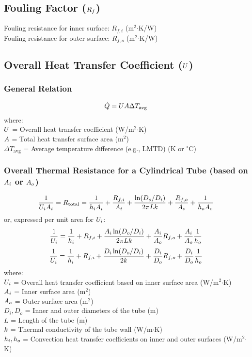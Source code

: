 \subsection{Fouling Factor ($R_f$)}
Fouling resistance for inner surface: $R_{f,i}$ (m$^2$$\cdot$K/W) \\
Fouling resistance for outer surface: $R_{f,o}$ (m$^2$$\cdot$K/W)

\subsection{Overall Heat Transfer Coefficient ($U$)}
\subsubsection*{General Relation}
\begin{equation}
    \dot{Q} = U A \Delta T_{\text{avg}}
\end{equation}
where: \\
$U$ = Overall heat transfer coefficient (W/m$^2$$\cdot$K) \\
$A$ = Total heat transfer surface area (m$^2$) \\
$\Delta T_{\text{avg}}$ = Average temperature difference (e.g., LMTD) (K or $^\circ$C)

\subsubsection*{Overall Thermal Resistance for a Cylindrical Tube (based on $A_i$ or $A_o$)}
\begin{equation}
    \frac{1}{U_i A_i} = R_{\text{total}} = \frac{1}{h_i A_i} + \frac{R_{f,i}}{A_i} + \frac{\ln(D_o/D_i)}{2\pi L k} + \frac{R_{f,o}}{A_o} + \frac{1}{h_o A_o}
\end{equation}
or, expressed per unit area for $U_i$:
\begin{equation}
    \frac{1}{U_i} = \frac{1}{h_i} + R_{f,i} + \frac{A_i \ln(D_o/D_i)}{2\pi L k} + \frac{A_i}{A_o} R_{f,o} + \frac{A_i}{A_o} \frac{1}{h_o}
\end{equation}
\begin{equation}
    \frac{1}{U_i} = \frac{1}{h_i} + R_{f,i} + \frac{D_i \ln(D_o/D_i)}{2k} + \frac{D_i}{D_o} R_{f,o} + \frac{D_i}{D_o} \frac{1}{h_o}
\end{equation}
where: \\
$U_i$ = Overall heat transfer coefficient based on inner surface area (W/m$^2$$\cdot$K) \\
$A_i$ = Inner surface area (m$^2$) \\
$A_o$ = Outer surface area (m$^2$) \\
$D_i, D_o$ = Inner and outer diameters of the tube (m) \\
$L$ = Length of the tube (m) \\
$k$ = Thermal conductivity of the tube wall (W/m$\cdot$K) \\
$h_i, h_o$ = Convection heat transfer coefficients on inner and outer surfaces (W/m$^2$$\cdot$K)

